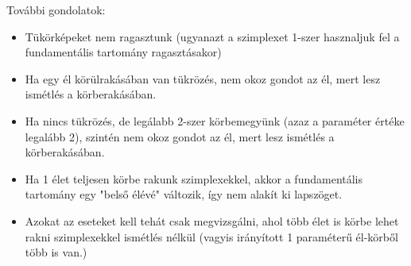 \documentclass[12pt,magyar,a4paper]{article}
\begin{document}
További gondolatok:
\begin{itemize}
  \item Tükörképeket nem ragasztunk (ugyanazt a szimplexet 1-szer hasznaljuk fel
    a fundamentális tartomány ragasztásakor)
  \item Ha egy él körülrakásában van tükrözés, nem okoz gondot az él, mert lesz
    ismétlés a körberakásában.
  \item Ha nincs tükrözés, de legálabb 2-szer körbemegyünk (azaz a paraméter
    értéke legalább 2), szintén nem okoz gondot az él, mert lesz ismétlés a
    körberakásában.
  \item Ha 1 élet teljesen körbe rakunk szimplexekkel, akkor a fundamentális
    tartomány egy "belső élévé" változik, így nem alakít ki lapszöget.
  \item Azokat az eseteket kell tehát csak megvizsgálni, ahol több élet is körbe
    lehet rakni szimplexekkel ismétlés nélkül (vagyis irányított 1 paraméterű
    él-körből több is van.)
\end{itemize}
\end{document}

